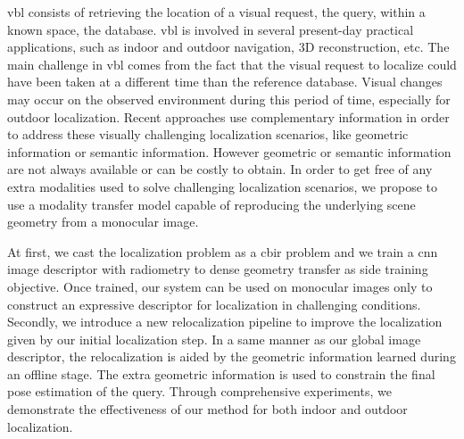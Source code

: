 \acresetall


\begin{abstracts}        %

\ac{vbl} consists of retrieving the location of a visual request, the query, within a known space, the database. \ac{vbl} is involved in several present-day practical applications, such as indoor and outdoor navigation, 3D reconstruction, etc. The main challenge in \ac{vbl} comes from the fact that the visual request to localize could have been taken at a different time than the reference database. Visual changes may occur on the observed environment during this period of time, especially for outdoor localization. Recent approaches use complementary information in order to address these visually challenging localization scenarios, like geometric information or semantic information. However geometric or semantic information are not always available or can be costly to obtain. In order to get free of any extra modalities used to solve challenging localization scenarios, we propose to use a modality transfer model capable of reproducing the underlying scene geometry from a monocular image. 

At first, we cast the localization problem as a \ac{cbir} problem and we train a \ac{cnn} image descriptor with radiometry to dense geometry transfer as side training objective. Once trained, our system can be used on monocular images only to construct an expressive descriptor for localization in challenging conditions. Secondly, we introduce a new relocalization pipeline to improve the localization given by our initial localization step. In a same manner as our global image descriptor, the relocalization is aided by the geometric information learned during an offline stage. The extra geometric information is used to constrain the final pose estimation of the query. Through comprehensive experiments, we demonstrate the effectiveness of our method for both indoor and outdoor localization.

\end{abstracts}

